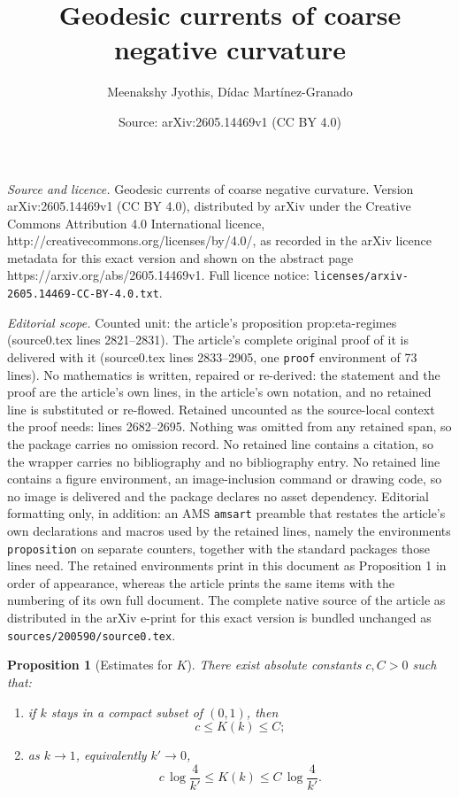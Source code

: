 \documentclass[10pt,a4paper]{amsart}
\title{Geodesic currents of coarse negative curvature}
\author{Meenakshy Jyothis, D\'idac Mart\'inez-Granado}
\date{Source: arXiv:2605.14469v1 (CC BY 4.0)}
\newtheorem{proposition}{Proposition}
\begin{document}
\maketitle

\noindent\emph{Source and licence.} Geodesic currents of coarse negative curvature. Version arXiv:2605.14469v1 (CC BY 4.0), distributed by arXiv under the Creative Commons Attribution 4.0 International licence, http://creativecommons.org/licenses/by/4.0/, as recorded in the arXiv licence metadata for this exact version and shown on the abstract page https://arxiv.org/abs/2605.14469v1. Full licence notice: \texttt{licenses/arxiv-2605.14469-CC-BY-4.0.txt}.\par\smallskip

\noindent\textit{Editorial scope.} Counted unit: the article's proposition prop:eta-regimes (source0.tex lines 2821--2831). The article's complete original proof of it is delivered with it (source0.tex lines 2833--2905, one \texttt{proof} environment of 73 lines). No mathematics is written, repaired or re-derived: the statement and the proof are the article's own lines, in the article's own notation, and no retained line is substituted or re-flowed.  Retained uncounted as the source-local context the proof needs: lines 2682--2695.  Nothing was omitted from any retained span, so the package carries no omission record.  No retained line contains a citation, so the wrapper carries no bibliography and no bibliography entry.  No retained line contains a figure environment, an image-inclusion command or drawing code, so no image is delivered and the package declares no asset dependency.  Editorial formatting only, in addition: an AMS \texttt{amsart} preamble that restates the article's own declarations and macros used by the retained lines, namely the environments \texttt{proposition} on separate counters, together with the standard packages those lines need.  The retained environments print in this document as Proposition 1 in order of appearance, whereas the article prints the same items with the numbering of its own full document.  The complete native source of the article as distributed in the arXiv e-print for this exact version is bundled unchanged as \texttt{sources/200590/source0.tex}.
\begin{proposition}[Estimates for $K$]
\label{prop:K-estimates}
There exist absolute constants $c,C>0$ such that:
\begin{enumerate}
\item if $k$ stays in a compact subset of $(0,1)$, then
\[
c\le K(k)\le C;
\]
\item as $k\to 1$, equivalently $k'\to 0$,
\[
c\,\log\frac{4}{k'}\le K(k)\le C\,\log\frac{4}{k'}.
\]
\end{enumerate}
\end{proposition}
\end{document}
